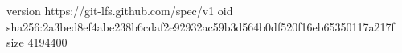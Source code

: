 version https://git-lfs.github.com/spec/v1
oid sha256:2a3bed8ef4abe238b6cdaf2e92932ac59b3d564b0df520f16eb65350117a217f
size 4194400
